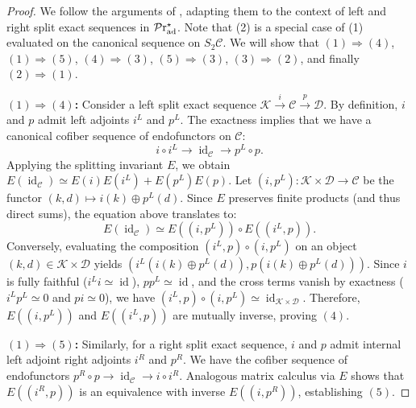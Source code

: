 \documentclass[a4paper,10pt, oneside]{amsart}
\begin{document}
	\begin{proof}
	We follow the arguments of \cite[Lemma B.7]{ramzi2024dualizable}, adapting them to the context of left and right split exact sequences in $\mathcal{P}\mathrm{r}_{\mathrm{ad}}^\star$. Note that (2) is a special case of (1) evaluated on the canonical sequence on $S_2 \mathcal{C}$. %
	We will show that $(1) \Rightarrow (4)$, $(1) \Rightarrow (5)$, $(4) \Rightarrow (3)$, $(5) \Rightarrow (3)$, $(3) \Rightarrow (2)$, and finally $(2) \Rightarrow (1)$.
		
		\textbf{$(1) \Rightarrow (4)$:} Consider a left split exact sequence $\mathcal{K} \xrightarrow{i} \mathcal{C} \xrightarrow{p} \mathcal{D}$. By definition, $i$ and $p$ admit left adjoints $i^L$ and $p^L$. The exactness implies that we have a canonical cofiber sequence of endofunctors on $\mathcal{C}$:
		$$ i \circ i^L \to \operatorname{id}_{\mathcal{C}} \to p^L \circ p. $$
		Applying the splitting invariant $E$, we obtain $E(\operatorname{id}_{\mathcal{C}}) \simeq E(i)E(i^L) + E(p^L)E(p)$. Let $(i, p^L): \mathcal{K} \times \mathcal{D} \to \mathcal{C}$ be the functor $(k, d) \mapsto i(k) \oplus p^L(d)$. Since $E$ preserves finite products (and thus direct sums), the equation above translates to:
		$$ E(\operatorname{id}_{\mathcal{C}}) \simeq E((i, p^L)) \circ E((i^L, p)). $$
		Conversely, evaluating the composition $(i^L, p) \circ (i, p^L)$ on an object $(k, d) \in \mathcal{K} \times \mathcal{D}$ yields $(i^L(i(k) \oplus p^L(d)), p(i(k) \oplus p^L(d)))$. Since $i$ is fully faithful ($i^L i \simeq \operatorname{id}$), $p p^L \simeq \operatorname{id}$, and the cross terms vanish by exactness ($i^L p^L \simeq 0$ and $p i \simeq 0$), we have $(i^L, p) \circ (i, p^L) \simeq \operatorname{id}_{\mathcal{K} \times \mathcal{D}}$. Therefore, $E((i, p^L))$ and $E((i^L, p))$ are mutually inverse, proving $(4)$.
		
		\textbf{$(1) \Rightarrow (5)$:} Similarly, for a right split exact sequence, $i$ and $p$ admit internal left adjoint right adjoints $i^R$ and $p^R$. We have the cofiber sequence of endofunctors $p^R \circ p \to \operatorname{id}_{\mathcal{C}} \to i \circ i^R$. Analogous matrix calculus via $E$ shows that $E((i^R, p))$ is an equivalence with inverse $E((i, p^R))$, establishing $(5)$.
		

\end{proof}
\end{document}
